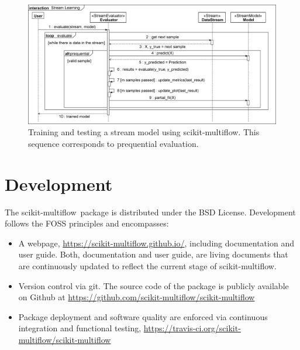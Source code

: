 \documentclass[twoside,11pt]{article}
\newcommand{\skmultiflow}{\textsf{scikit-multiflow}\xspace}
\begin{document}
\begin{figure}[!h]
	\centering
    \includegraphics[width=\textwidth]{prequential}
    \caption{Training and testing a stream model using \skmultiflow. This sequence corresponds to prequential evaluation.}\label{fig:learn_seq}
\end{figure}

\section{Development}\label{sec:Development}
The \skmultiflow~package is distributed under the BSD License. Development follows the FOSS principles and encompasses:
\begin{itemize}[noitemsep]
\item A webpage, \url{https://scikit-multiflow.github.io/}, including documentation and user guide. Both, documentation and user guide, are living documents that are continuously updated to reflect the current stage of \skmultiflow.
\item Version control via git. The source code of the package is publicly available on Github at \url{https://github.com/scikit-multiflow/scikit-multiflow}
\item Package deployment and software quality are enforced via continuous integration and functional testing, \url{https://travis-ci.org/scikit-multiflow/scikit-multiflow}
\end{itemize}




\end{document}

